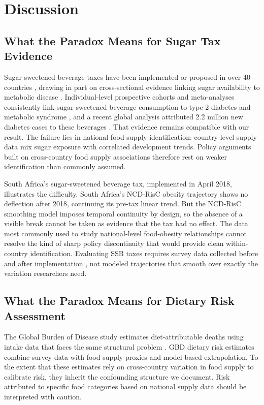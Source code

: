 \section{Discussion}

\subsection{What the Paradox Means for Sugar Tax Evidence}

Sugar-sweetened beverage taxes have been implemented or proposed in over 40 countries \cite{who2023ssb}, drawing in part on cross-sectional evidence linking sugar availability to metabolic disease \cite{basu2013, basu2013ajph}. Individual-level prospective cohorts and meta-analyses consistently link sugar-sweetened beverage consumption to type 2 diabetes and metabolic syndrome \cite{imamura2015, malik2010}, and a recent global analysis attributed 2.2 million new diabetes cases to these beverages \cite{laracastor2025}. That evidence remains compatible with our result. The failure lies in national food-supply identification: country-level supply data mix sugar exposure with correlated development trends. Policy arguments built on cross-country food supply associations therefore rest on weaker identification than commonly assumed.

South Africa's sugar-sweetened beverage tax, implemented in April 2018, illustrates the difficulty. South Africa's NCD-RisC obesity trajectory shows no deflection after 2018, continuing its pre-tax linear trend. But the NCD-RisC smoothing model imposes temporal continuity by design, so the absence of a visible break cannot be taken as evidence that the tax had no effect. The data most commonly used to study national-level food-obesity relationships cannot resolve the kind of sharp policy discontinuity that would provide clean within-country identification. Evaluating SSB taxes requires survey data collected before and after implementation \cite{colchero2016}, not modeled trajectories that smooth over exactly the variation researchers need.

\subsection{What the Paradox Means for Dietary Risk Assessment}

The Global Burden of Disease study estimates diet-attributable deaths using intake data that faces the same structural problem \cite{gbd2019}. GBD dietary risk estimates combine survey data with food supply proxies and model-based extrapolation. To the extent that these estimates rely on cross-country variation in food supply to calibrate risk, they inherit the confounding structure we document. Risk attributed to specific food categories based on national supply data should be interpreted with caution.

